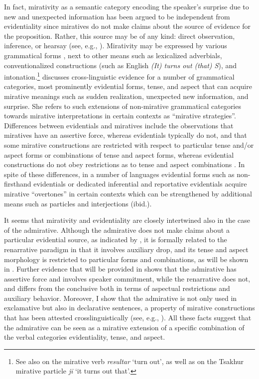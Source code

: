 \documentclass[output=paper]{langscibook}
\begin{document}
In fact, mirativity as a semantic category encoding the speaker's surprise due to new and unexpected information has been argued to be independent from evidentiality since miratives do not make claims about the source of evidence for the proposition. Rather, this source may be of any kind: direct observation, inference, or hearsay (see, e.g., \citealt{Jacobsen1964,Watters2002}). Mirativity may be expressed by various grammatical forms \citep{DeLancey1997,DeLancey2001,DeLancey2012}, next to other means such as lexicalized adverbials, conventionalized constructions (such as English \textit{(It) turns out (that) S}), and intonation.\footnote{See also \citet[160]{Bustamante2013} on the  mirative verb \textit{resultar} `turn out', as well as \citet[290]{TatevosovMaisak1999} on the Tsakhur mirative particle \textit{jī} `it turns out that'.} \citet{Aikhenvald2012} discusses cross-linguistic evidence for a number of grammatical categories, most prominently evidential forms, tense, and aspect that can acquire mirative meanings such as sudden realization, unexpected new information, and surprise. She refers to such extensions of non-mirative grammatical categories towards mirative interpretations in certain contexts as ``mirative strategies''. Differences between evidentials and miratives include the observations that miratives have an assertive force, whereas evidentials typically do not, and that some mirative constructions are restricted with respect to particular tense and/or aspect forms or combinations of tense and aspect forms, whereas evidential constructions do not obey restrictions as to tense and aspect combinations \citep[441]{Aikhenvald2012}.
In spite of these differences, in a number of languages evidential forms such as non-firsthand evidentials or dedicated inferential and reportative evidentials acquire mirative ``overtones'' in certain contexts which can be strengthened by additional means such as particles and interjections (ibid.).

It seems that mirativity and evidentiality are closely intertwined also in the case of the  admirative. Although the  admirative does not make claims about a particular evidential source, as indicated by , it is formally related to the renarrative paradigm in that it involves auxiliary drop, and its tense and aspect morphology is restricted to particular forms and combinations, as will be shown in . Further evidence that will be provided in  shows that the  admirative has assertive force and involves speaker commitment, while the renarrative does not, and differs from the conclusive both in terms of aspectual restrictions and auxiliary behavior. Moreover, I show that the admirative is not only used in exclamative but also in declarative sentences, a property of mirative constructions that has been attested crosslinguistically (see, e.g., \citealt{Bustamante2013}). All these facts suggest that the  admirative can be seen as a mirative extension of a specific combination of the verbal categories evidentiality, tense, and aspect.
\end{document}

